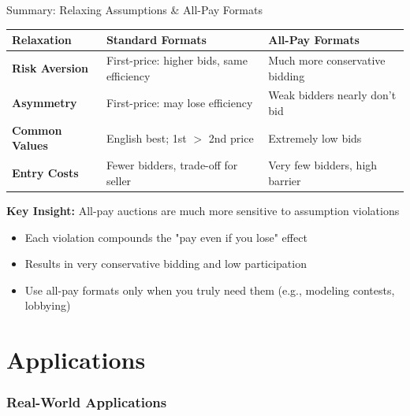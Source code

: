 \documentclass[xcolor={x11names}]{beamer}
\begin{document}
\begin{frame}{Summary: Relaxing Assumptions \& All-Pay Formats}
\begin{center}
\begin{tabular}{|p{3cm}|p{3.5cm}|p{3cm}|}
\hline
\textbf{Relaxation} & \textbf{Standard Formats} & \textbf{All-Pay Formats} \\
\hline
\rowcolor{blue!10}
\textbf{Risk Aversion} & 
First-price: higher bids, same efficiency & 
Much more conservative bidding \\
\hline
\rowcolor{green!10}
\textbf{Asymmetry} & 
First-price: may lose efficiency & 
Weak bidders nearly don't bid \\
\hline
\rowcolor{yellow!10}
\textbf{Common Values} & 
English best; 1st $>$ 2nd price & 
Extremely low bids \\
\hline
\rowcolor{red!10}
\textbf{Entry Costs} & 
Fewer bidders, trade-off for seller & 
Very few bidders, high barrier \\
\hline
\end{tabular}
\end{center}

\vspace{0.4cm}
\textbf{Key Insight:} All-pay auctions are much more sensitive to assumption violations
\begin{itemize}
  \item Each violation compounds the "pay even if you lose" effect
  \item Results in very conservative bidding and low participation
  \item Use all-pay formats only when you truly need them (e.g., modeling contests, lobbying)
\end{itemize}
\end{frame}

\part{Applications}

\section{Real-World Applications}
\end{document}
